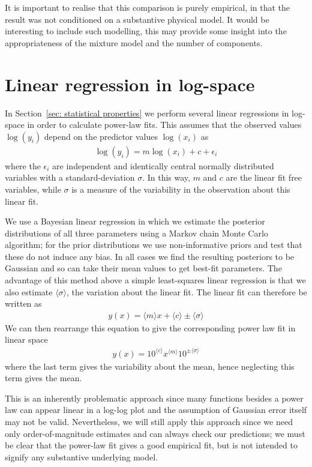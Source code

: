 \documentclass[../full_thesis/full_thesis.tex]{subfiles}
\begin{document}
\begin{subappendices}
It is important to realise that this comparison is purely
empirical, in that the result was not conditioned on a substantive physical
model. It would be interesting to include such modelling, this may provide some
insight into the appropriateness of the mixture model and the number of
components.

\section{Linear regression in log-space}
\label{sec: linear regression in log-space}
In Section~\ref{sec: statistical properties} we perform several linear regressions
in log-space in order to calculate power-law fits. This assumes that the observed
values $\log(y_i)$ depend on the predictor values $\log(x_{i})$ as
\begin{align}
\log(y_i) = m \log(x_i) + c + \epsilon_i
\label{eqn: linear regression}
\end{align}
where the $\epsilon_i$ are independent and
identically central normally  distributed variables with a standard-deviation $\sigma$.
In this way, $m$ and $c$ are the linear fit free variables, while $\sigma$ is
a measure of the variability in the observation about this linear fit.

We use a Bayesian linear regression in which we estimate the posterior distributions
of all three parameters using a Markov chain Monte Carlo algorithm; for the prior
distributions we use non-informative priors and test that these do not induce
any bias. In all cases we find the resulting posteriors to be Gaussian and so
can take their mean values to get best-fit parameters.
The advantage of this
method above a simple least-squares linear regression is that we also estimate
$\langle\sigma\rangle$, the variation about the linear fit. The linear fit can
therefore be written as
\begin{align}
y(x) = \langle m \rangle x + \langle c \rangle \pm \langle \sigma \rangle
\end{align}
We can then rearrange this equation to give the corresponding power law fit
in linear space
\begin{align}
y(x) = 10^{\langle c\rangle}x^{\langle m \rangle} 10^{\pm \langle\sigma\rangle}
\end{align}
where the last term gives the variability about the mean, hence neglecting
this term gives the mean.

This is an inherently problematic approach since many functions besides a
power law can appear linear in a log-log plot and the assumption of
Gaussian error itself may not be valid. Nevertheless, we will still apply this
approach since we need only order-of-magnitude estimates and can always check
our predictions; we must be clear that the power-law fit gives a good empirical
fit, but is not intended to signify any substantive underlying model.



\end{subappendices}
\end{document}
